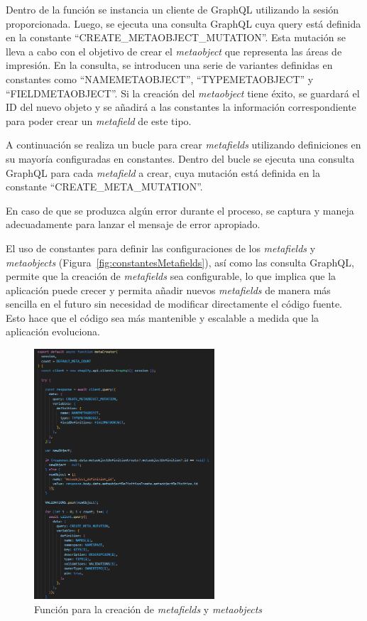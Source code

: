 \documentclass[11pt]{article}
\begin{document}
Dentro de la función se instancia un cliente de GraphQL utilizando la sesión proporcionada. Luego, se ejecuta una consulta GraphQL cuya query está definida en la constante ``CREATE\_METAOBJECT\_MUTATION''.  
Esta mutación se lleva a cabo con el objetivo de crear el \textit{metaobject} que representa las áreas de impresión. En la consulta, se introducen una serie de variantes definidas en constantes como ``NAMEMETAOBJECT'', 
``TYPEMETAOBJECT'' y ``FIELDMETAOBJECT''. Si la creación del \textit{metaobject} tiene éxito, se guardará el ID del nuevo objeto y se añadirá a las constantes 
la información correspondiente para poder crear un \textit{metafield} de este tipo.

A continuación se realiza un bucle para crear \textit{metafields} utilizando definiciones en su mayoría configuradas en constantes. Dentro del bucle se ejecuta una consulta GraphQL para cada \textit{metafield} a crear, cuya mutación
está definida en la constante  ``CREATE\_META\_MUTATION''.

En caso de que se produzca algún error durante el proceso, se captura y maneja adecuadamente para lanzar el mensaje de error apropiado.

El uso de constantes para definir las configuraciones de los \textit{metafields} y \textit{metaobjects} (Figura~\ref{fig:constantesMetafields}), así como las consulta GraphQL, permite que la creación
de \textit{metafields} sea configurable, lo que implica que la aplicación puede crecer y permita añadir nuevos \textit{metafields} de manera más sencilla en el futuro 
sin necesidad de modificar directamente el código fuente. Esto hace que el código sea más mantenible y escalable a medida que la 
aplicación evoluciona.


\begin{figure}[H]
    \centering
    \includegraphics[width=0.6\textwidth]{imagenes-back/funcionmetaCreator.png}
    \caption{\label{fig:funcionMetafields} Función para la creación de \textit{metafields} y \textit{metaobjects}}
    \vspace{\fill}
\end{figure}
\end{document}
